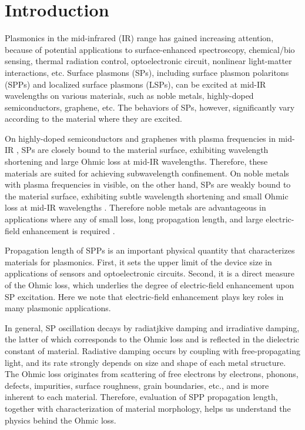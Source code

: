 \documentclass[aip,apl,reprint]{revtex4-1}
\begin{document}
\section{Introduction}
Plasmonics in the mid-infrared (IR) range has gained increasing attention\cite{Stanley, Law}, because of potential applications to surface-enhanced spectroscopy\cite{Neubrech, Hoang}, chemical/bio sensing\cite{Cleary2008}, thermal radiation control\cite{Kusunoki}, optoelectronic circuit\cite{Ebbesen, Soref}, nonlinear light-matter interactions\cite{Kusa2015}, etc. Surface plasmons (SPs), including surface plasmon polaritons (SPPs) and localized surface plasmons (LSPs), can be excited at mid-IR wavelengths on various materials, such as noble metals, highly-doped semiconductors, graphene, etc\cite{Law}. The behaviors of SPs, however, significantly vary according to the material where they are excited. 

On highly-doped semiconductors and graphenes with plasma frequencies in mid-IR \cite{Law}, SPs are closely bound to the material surface, exhibiting wavelength shortening and large Ohmic loss at mid-IR wavelengths. Therefore, these materials are suited for achieving subwavelength confinement. On noble metals with plasma frequencies in visible, on the other hand,
 SPs are weakly bound to the material surface, exhibiting subtle wavelength shortening and small Ohmic loss at mid-IR wavelengths . Therefore noble metals are advantageous in applications where any of small loss, long propagation length, and large electric-field enhancement is required \cite{Law, Kusa2014}.

Propagation length of SPPs is an important physical quantity that characterizes materials for plasmonics. First, it sets the upper limit of the device size in applications of sensors and optoelectronic circuits. Second, it is a direct measure of the Ohmic loss, which underlies the degree of electric-field enhancement upon SP excitation. Here we note that electric-field enhancement plays key roles in many plasmonic applications. 

In general, SP oscillation decays by radiatjkive damping and irradiative damping\cite{Link}, the latter of which corresponds to the Ohmic loss and is reflected in the dielectric constant of material. Radiative damping occurs by coupling with free-propagating light, and its rate strongly depends on size and shape of each metal structure. The Ohmic loss originates from scattering of free electrons by electrons, phonons, defects, impurities, surface roughness, grain boundaries, etc., and is more inherent to each material. Therefore, evaluation of SPP propagation length, together with characterization of material morphology, helps us understand the physics behind the Ohmic loss.
\end{document}
